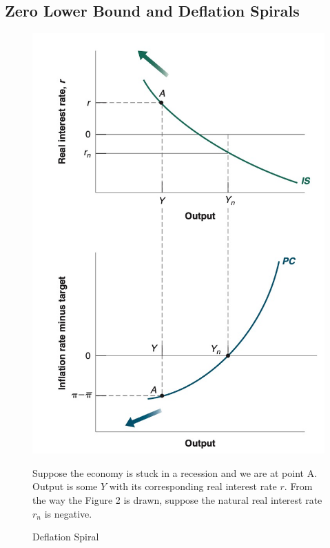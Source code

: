 \documentclass{extarticle}
\begin{document}
\subsection{Zero Lower Bound and Deflation Spirals}
\begin{figure}[H] 
  \centering %
  \begin{minipage}{0.35\linewidth} 
    \centering 
    \includegraphics[width=\linewidth]{deflation.png} 
    \caption{Deflation Spiral} 
    \label{fig:deflation} 
  \end{minipage}%
  \begin{minipage}{0.65\linewidth}
    Suppose the economy is stuck in a recession and we are at point A. Output is some $Y$ with its corresponding real interest rate $r$. From the way the Figure 2 is drawn, suppose the natural real interest rate $r_n$ is negative.


\end{minipage}
\end{figure}
\end{document}
